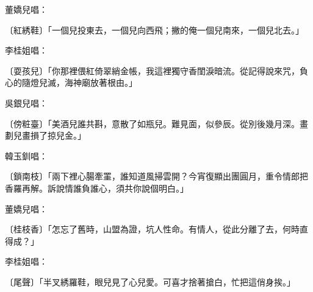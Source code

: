 \begin{showcontents}{}
董嬌兒唱：

〔紅綉鞋〕「一個兒投東去，一個兒向西飛；撇的俺一個兒南來，一個兒北去。」

李桂姐唱：

〔耍孩兒〕「你那裡偎紅倚翠綃金帳，我這裡獨守香閨淚暗流。從記得說來咒，負心的隨燈兒滅，海神廟放著根由。」

吳銀兒唱：

〔傍粧臺〕「美酒兒誰共斟，意散了如瓶兒。難見面，似參辰。從別後幾月深。畫劃兒畫損了掠兒金。」

韓玉釧唱：

〔鎖南枝〕「兩下裡心腸牽罣，誰知道風掃雲開？今宵復顯出團圓月，重令情郎把香羅再解。訴說情誰負誰心，須共你說個明白。」

董嬌兒唱：

〔桂枝香〕「怎忘了舊時，山盟為證，坑人性命。有情人，從此分離了去，何時直得成？」

李桂姐唱：

〔尾聲〕「半叉綉羅鞋，眼兒見了心兒愛。可喜才捨著搶白，忙把這俏身挨。」


\end{showcontents}
